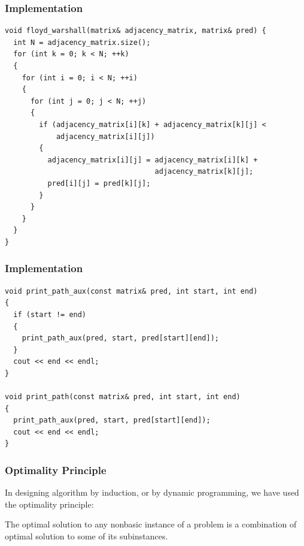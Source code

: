 \documentclass{beamer}
\begin{document}
\begin{frame}[containsverbatim]
\frametitle{Implementation}

\scriptsize
\begin{lstlisting}
void floyd_warshall(matrix& adjacency_matrix, matrix& pred) {
  int N = adjacency_matrix.size();
  for (int k = 0; k < N; ++k)
  {
    for (int i = 0; i < N; ++i)
    {
      for (int j = 0; j < N; ++j)
      {
        if (adjacency_matrix[i][k] + adjacency_matrix[k][j] <
            adjacency_matrix[i][j])
        {
          adjacency_matrix[i][j] = adjacency_matrix[i][k] +
                                   adjacency_matrix[k][j];
          pred[i][j] = pred[k][j];
        }
      }
    }
  }
}
\end{lstlisting}

\end{frame}

\begin{frame}[containsverbatim]
\frametitle{Implementation}

\scriptsize
\begin{lstlisting}
void print_path_aux(const matrix& pred, int start, int end)
{
  if (start != end)
  {
    print_path_aux(pred, start, pred[start][end]);
  }
  cout << end << endl;
}

void print_path(const matrix& pred, int start, int end)
{
  print_path_aux(pred, start, pred[start][end]);
  cout << end << endl;
}
\end{lstlisting}

\end{frame}

\fi

\begin{frame}%
\frametitle{Optimality Principle}

In designing algorithm by induction, or by dynamic programming, we have used the optimality principle:

\vspace{0.2cm}


\begin{mdframed}[style=exampledefault]
The optimal solution to any nonbasic instance of a problem is a combination of optimal
solution to some of its subinstances.
\end{mdframed}

\end{frame}
\end{document}
